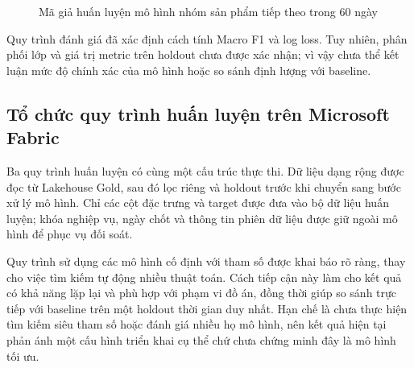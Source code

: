 \begin{figure}[H]\centering
{}
\caption{Mã giả huấn luyện mô hình nhóm sản phẩm tiếp theo trong 60 ngày}
\label{fig:pseudo-next-category-60d}
\end{figure}

Quy trình đánh giá đã xác định cách tính Macro F1 và log loss. Tuy nhiên, phân phối lớp và giá trị metric trên holdout chưa được xác nhận; vì vậy chưa thể kết luận mức độ chính xác của mô hình hoặc so sánh định lượng với baseline.

\subsection{Tổ chức quy trình huấn luyện trên Microsoft Fabric}

Ba quy trình huấn luyện có cùng một cấu trúc thực thi. Dữ liệu dạng rộng được đọc từ Lakehouse Gold, sau đó lọc riêng  và holdout trước khi chuyển sang bước xử lý mô hình. Chỉ các cột đặc trưng và target được đưa vào bộ dữ liệu huấn luyện; khóa nghiệp vụ, ngày chốt và thông tin phiên dữ liệu được giữ ngoài mô hình để phục vụ đối soát.

Quy trình sử dụng các mô hình cố định với tham số được khai báo rõ ràng, thay cho việc tìm kiếm tự động nhiều thuật toán. Cách tiếp cận này làm cho kết quả có khả năng lặp lại và phù hợp với phạm vi đồ án, đồng thời giúp so sánh trực tiếp với baseline trên một holdout thời gian duy nhất. Hạn chế là chưa thực hiện tìm kiếm siêu tham số hoặc đánh giá nhiều họ mô hình, nên kết quả hiện tại phản ánh một cấu hình triển khai cụ thể chứ chưa chứng minh đây là mô hình tối ưu.

